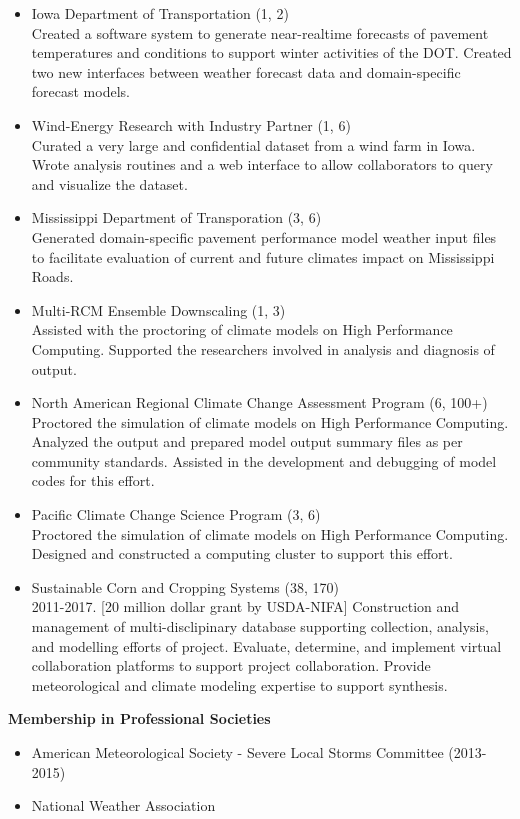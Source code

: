 \documentclass[11pt]{article}
\begin{document}
\begin{itemize}
\item Iowa Department of Transportation (1, 2)\\
Created a software system to generate near-realtime forecasts of pavement
temperatures and conditions to support winter activities of the DOT.  Created
two new interfaces between weather forecast data and domain-specific forecast
models.
\item Wind-Energy Research with Industry Partner (1, 6)\\
Curated a very large and confidential dataset from a wind farm in Iowa. Wrote
analysis routines and a web interface to allow collaborators to query and
visualize the dataset.
\item Mississippi Department of Transporation (3, 6)\\
Generated domain-specific pavement performance model weather input files
to facilitate evaluation of current and future climates impact on 
Mississippi Roads.
\item Multi-RCM Ensemble Downscaling (1, 3)\\
Assisted with the proctoring of climate models on High Performance Computing.
Supported the researchers involved in analysis and diagnosis of output.
\item North American Regional Climate Change Assessment Program (6, 100+)\\
Proctored the simulation of climate models on High Performance Computing.
 Analyzed the output and prepared model output summary files as per 
community standards.  Assisted in the development and debugging of model
codes for this effort.
\item Pacific Climate Change Science Program (3, 6)\\
Proctored the simulation of climate models on High Performance Computing.
Designed and constructed a computing cluster to support this effort.
\item Sustainable Corn and Cropping Systems (38, 170)\\
2011-2017. [20 million dollar grant by USDA-NIFA] Construction and management of multi-disclipinary database supporting collection, analysis, and modelling efforts of project. 
Evaluate, determine, and implement virtual collaboration platforms to 
support project collaboration.  Provide meteorological and climate modeling
expertise to support synthesis.
\end{itemize}
%

\begin{fullcv}
\Large \bf Membership in Professional Societies
\normalsize \sf	
\begin{itemize}
\item American Meteorological Society - Severe Local Storms Committee (2013-2015)
\item National Weather Association
\end{itemize}
\end{fullcv}
\end{document}
